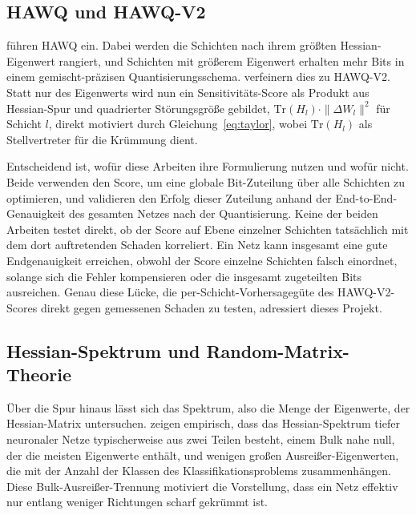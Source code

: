 \subsection{HAWQ und HAWQ-V2}
\label{sec:fund-hawq}

\citet{dong_hawq_2019} führen HAWQ ein. Dabei werden die Schichten nach ihrem größten Hessian-Eigenwert rangiert, und Schichten mit größerem Eigenwert erhalten mehr Bits in einem gemischt-präzisen Quantisierungsschema. \citet{dong_hawqv2_2020} verfeinern dies zu HAWQ-V2. Statt nur des Eigenwerts wird nun ein Sensitivitäts-Score als Produkt aus Hessian-Spur und quadrierter Störungsgröße gebildet, $\mathrm{Tr}(H_l)\cdot\|\Delta W_l\|^2$ für Schicht $l$, direkt motiviert durch Gleichung~\eqref{eq:taylor}, wobei $\mathrm{Tr}(H_l)$ als Stellvertreter für die Krümmung dient.
\par\medskip

Entscheidend ist, wofür diese Arbeiten ihre Formulierung nutzen und wofür nicht. Beide verwenden den Score, um eine globale Bit-Zuteilung über alle Schichten zu optimieren, und validieren den Erfolg dieser Zuteilung anhand der End-to-End-Genauigkeit des gesamten Netzes nach der Quantisierung. Keine der beiden Arbeiten testet direkt, ob der Score auf Ebene einzelner Schichten tatsächlich mit dem dort auftretenden Schaden korreliert. Ein Netz kann insgesamt eine gute Endgenauigkeit erreichen, obwohl der Score einzelne Schichten falsch einordnet, solange sich die Fehler kompensieren oder die insgesamt zugeteilten Bits ausreichen. Genau diese Lücke, die per-Schicht-Vorhersagegüte des HAWQ-V2-Scores direkt gegen gemessenen Schaden zu testen, adressiert dieses Projekt.

\subsection{Hessian-Spektrum und Random-Matrix-Theorie}
\label{sec:fund-rmt}

Über die Spur hinaus lässt sich das Spektrum, also die Menge der Eigenwerte, der Hessian-Matrix untersuchen. \citet{sagun_singularity_2016, sagun_empirical_2017} zeigen empirisch, dass das Hessian-Spektrum tiefer neuronaler Netze typischerweise aus zwei Teilen besteht, einem Bulk nahe null, der die meisten Eigenwerte enthält, und wenigen großen Ausreißer-Eigenwerten, die mit der Anzahl der Klassen des Klassifikationsproblems zusammenhängen. Diese Bulk-Ausreißer-Trennung motiviert die Vorstellung, dass ein Netz effektiv nur entlang weniger Richtungen scharf gekrümmt ist.
\par\medskip

